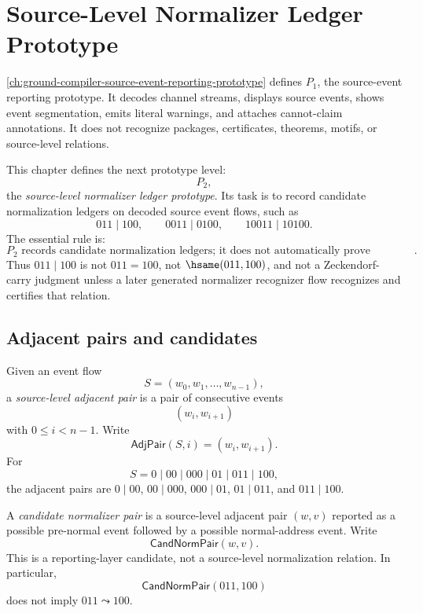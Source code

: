 \chapter{Source-Level Normalizer Ledger Prototype}
\label{ch:ground-compiler-source-normalizer-ledger-prototype}

\autoref{ch:ground-compiler-source-event-reporting-prototype} defines $P_1$, the source-event reporting prototype. It decodes channel streams, displays source events, shows event segmentation, emits literal warnings, and attaches cannot-claim annotations. It does not recognize packages, certificates, theorems, motifs, or source-level relations.

This chapter defines the next prototype level:
$$
  P_2,
$$
the \emph{source-level normalizer ledger prototype}. Its task is to record candidate normalization ledgers on decoded source event flows, such as
$$
  011\mid 100,\qquad
  0011\mid 0100,\qquad
  10011\mid 10100.
$$
The essential rule is:
$$
  \boxed{P_2\text{ records candidate normalization ledgers; it does not automatically prove normalization relations}.}
$$
Thus $011\mid 100$ is not $011=100$, not $\hsame(011,100)$, and not a Zeckendorf-carry judgment unless a later generated normalizer recognizer flow recognizes and certifies that relation.

\section{Adjacent pairs and candidates}
\label{sec:source-normalizer-adjacent-candidates}

\begin{definition}
\label{def:source-normalizer-adjacent-pair}
Given an event flow
$$
  S=(w_0,w_1,\ldots,w_{n-1}),
$$
a \emph{source-level adjacent pair} is a pair of consecutive events
$$
  (w_i,w_{i+1})
$$
with $0\le i<n-1$. Write
$$
  \mathsf{AdjPair}(S,i)=(w_i,w_{i+1}).
$$
For
$$
  S=0\mid 00\mid 000\mid 01\mid 011\mid 100,
$$
the adjacent pairs are $0\mid 00$, $00\mid 000$, $000\mid 01$, $01\mid 011$, and $011\mid 100$.
\end{definition}

\begin{definition}
\label{def:source-normalizer-candidate-pair}
A \emph{candidate normalizer pair} is a source-level adjacent pair $(w,v)$ reported as a possible pre-normal event followed by a possible normal-address event. Write
$$
  \mathsf{CandNormPair}(w,v).
$$
This is a reporting-layer candidate, not a source-level normalization relation. In particular,
$$
  \mathsf{CandNormPair}(011,100)
$$
does not imply $011\leadsto 100$.
\end{definition}

